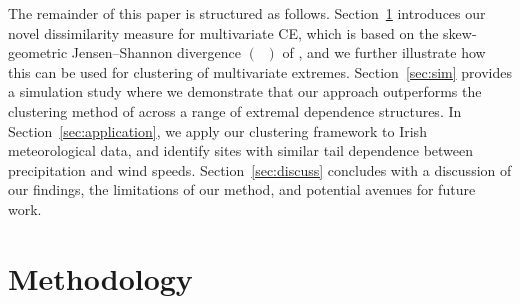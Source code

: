 \documentclass[12pt]{article}
\newcommand{\JSGa}{\mathop{\mathrm{JS}^{\mathrm{G}_{\lambda}}}\nolimits}
\begin{document}
The remainder of this paper is structured as follows.
Section~\ref{sec:method} introduces our novel dissimilarity measure for multivariate CE, which is based on the 
skew-geometric Jensen--Shannon divergence $\left(\JSGa{}\right)$ of \citet{Nielsen2019}, and we further illustrate how this can be used for clustering of multivariate extremes. 
Section~\ref{sec:sim} provides a simulation study where we demonstrate that our approach outperforms the clustering method of \citet{Vignotto2021} across a range of extremal dependence structures. 
In Section~\ref{sec:application}, we apply our clustering framework to Irish meteorological data, and identify sites with similar tail dependence between precipitation and wind speeds.
Section~\ref{sec:discuss} concludes with a discussion of our findings, the limitations of our method, and potential avenues for future work.

\section{Methodology}
\label{sec:method}

\end{document}
